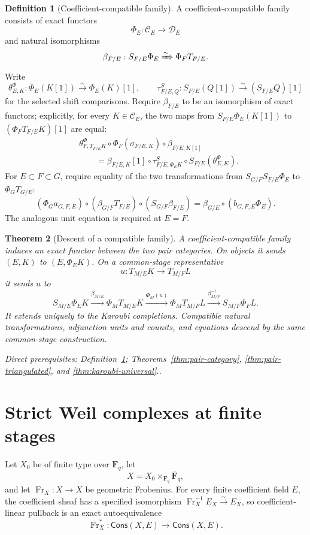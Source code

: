 \documentclass[10pt]{article}
\newtheorem{theorem}{Theorem}[section]
\theoremstyle{definition}
\newtheorem{definition}[theorem]{Definition}
\newcommand{\Cons}{\mathsf{Cons}}
\newcommand{\FrX}{\operatorname{Fr}_X}
\newcommand{\depends}[1]{\par\smallskip\noindent\textit{Direct prerequisites:} #1.}
\begin{document}
\begin{definition}[Coefficient-compatible family]\label{def:compatible-family}
A coefficient-compatible family consists of exact functors
\[
 \Phi_E:\mathcal C_E\longrightarrow\mathcal D_E
\]
and natural isomorphisms
\[
 \beta_{F/E}:S_{F/E}\Phi_E
 \xRightarrow{\sim}\Phi_FT_{F/E}.
\]
Write
\[
 \theta^\Phi_{E,K}:\Phi_E(K[1])\xrightarrow{\sim}\Phi_E(K)[1],
 \qquad
 \tau^S_{F/E,Q}:S_{F/E}(Q[1])\xrightarrow{\sim}(S_{F/E}Q)[1]
\]
for the selected shift comparisons.  Require $\beta_{F/E}$ to be an
isomorphism of exact functors; explicitly, for every $K\in\mathcal C_E$,
the two maps from $S_{F/E}\Phi_E(K[1])$ to
$(\Phi_FT_{F/E}K)[1]$ are equal:
\[
\begin{aligned}
 &\theta^\Phi_{F,T_{F/E}K}\circ
   \Phi_F(\sigma_{F/E,K})\circ\beta_{F/E,K[1]}\\
 &\qquad=
 \beta_{F/E,K}[1]\circ\tau^S_{F/E,\Phi_EK}\circ
 S_{F/E}(\theta^\Phi_{E,K}).
\end{aligned}
\]
For $E\subset F\subset G$, require equality of the two transformations
from $S_{G/F}S_{F/E}\Phi_E$ to $\Phi_GT_{G/E}$:
\[
 (\Phi_Ga_{G,F,E})\circ
 (\beta_{G/F}T_{F/E})\circ(S_{G/F}\beta_{F/E})
 =\beta_{G/E}\circ(b_{G,F,E}\Phi_E).
\]
The analogous unit equation is required at $E=F$.
\end{definition}

\begin{theorem}[Descent of a compatible family]
\label{thm:functor-descent}
A coefficient-compatible family induces an exact functor between the two
pair categories.  On objects it sends $(E,K)$ to $(E,\Phi_EK)$.  On a
common-stage representative
\[
 u:T_{M/E}K\longrightarrow T_{M/F}L
\]
it sends $u$ to
\[
 S_{M/E}\Phi_EK
 \xrightarrow{\beta_{M/E}}
 \Phi_MT_{M/E}K
 \xrightarrow{\Phi_M(u)}
 \Phi_MT_{M/F}L
 \xrightarrow{\beta_{M/F}^{-1}}
 S_{M/F}\Phi_FL.
\]
It extends uniquely to the Karoubi completions.  Compatible natural
transformations, adjunction units and counits, and equations descend by the
same common-stage construction.
\depends{Definition~\ref{def:compatible-family};
Theorems~\ref{thm:pair-category}, \ref{thm:pair-triangulated}, and
\ref{thm:karoubi-universal}.}
\end{theorem}

\section{Strict Weil complexes at finite stages}

Let $X_0$ be of finite type over $\mathbf F_q$, let
\[
 X=X_0\times_{\mathbf F_q}\overline{\mathbf F}_q,
\]
and let $\FrX:X\to X$ be geometric Frobenius.  For every finite coefficient
field $E$, the coefficient sheaf has a specified isomorphism
$\FrX^{-1}E_X\xrightarrow{\sim}E_X$, so coefficient-linear pullback is an
exact autoequivalence
\[
 \FrX^*:\Cons(X,E)\longrightarrow\Cons(X,E).
\]
\end{document}
